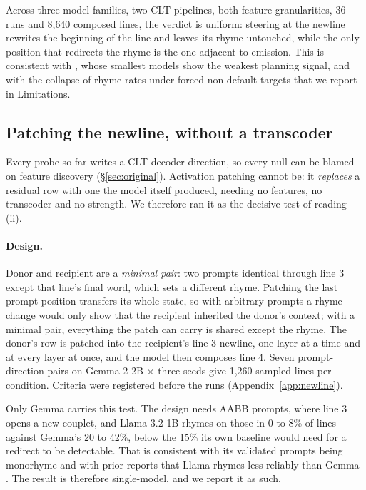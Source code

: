\documentclass[11pt]{article}
\begin{document}
Across three model families, two CLT pipelines, both feature granularities, 36 runs and 8{,}640 composed lines, the verdict is uniform: steering at the newline rewrites the beginning of the line and leaves its rhyme untouched, while the only position that redirects the rhyme is the one adjacent to emission. This is consistent with \citet{hanna2026latent}, whose smallest models show the weakest planning signal, and with the collapse of rhyme rates under forced non-default targets that we report in Limitations.

\subsection{Patching the newline, without a transcoder}
\label{sec:patching}

Every probe so far writes a CLT decoder direction, so every null can be blamed on
feature discovery (\S\ref{sec:original}). Activation patching cannot be: it
\emph{replaces} a residual row with one the model itself produced, needing no
features, no transcoder and no strength. We therefore ran it as the decisive test
of reading (ii).

\paragraph{Design.}
Donor and recipient are a \emph{minimal pair}: two prompts identical through line
3 except that line's final word, which sets a different rhyme. Patching the last
prompt position transfers its whole state, so with arbitrary prompts a rhyme
change would only show that the recipient inherited the donor's context; with a
minimal pair, everything the patch can carry is shared except the rhyme. The
donor's row is patched into the recipient's line-3 newline, one layer at a time
and at every layer at once, and the model then composes line 4. Seven
prompt-direction pairs on Gemma 2 2B $\times$ three seeds give 1{,}260 sampled
lines per condition. Criteria were registered before the runs (Appendix~\ref{app:newline}).

Only Gemma carries this test. The design needs AABB prompts, where line 3 opens a
new couplet, and Llama 3.2 1B rhymes on those in 0 to 8\% of lines against Gemma's
20 to 42\%, below the 15\% its own baseline would need for a redirect to be
detectable. That is consistent with its validated prompts being monorhyme and with
prior reports that Llama rhymes less reliably than Gemma \citep{pliprs2026}. The
result is therefore single-model, and we report it as such.
\end{document}
